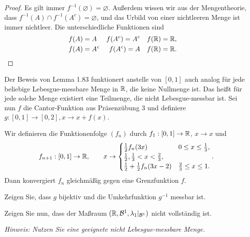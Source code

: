 \begin{proof}
	Es gilt immer $f^{-1}(\varnothing)=\varnothing$. Außerdem wissen wir aus der Mengentheorie, dass $f^{-1}(A)\cap f^{-1}(A^c)=\varnothing$, und das Urbild von einer nichtleeren Menge ist immer nichtleer. Die unterschiedliche Funktionen sind
	\begin{align*}
		& f(A)=A & f(A^c)=A^c & & f(\mathbb{R})=\mathbb{R}, \\
		& f(A)=A^c & f(A^c)=A & & f(\mathbb{R})=\mathbb{R}. & \qedhere
	\end{align*}
\end{proof}
\begin{Problem}
	Der Beweis von Lemma 1.83 funktionert anstelle von $[0,1]$ auch analog f\"{u}r jede beliebige Lebesgue-messbare Menge in $\mathbb{R}$, die keine Nullmenge ist. Das heißt f\"{u}r jede solche Menge existiert eine Teilmenge, die nicht Lebesgue-messbar ist.
	Sei nun $f$ die Cantor-Funktion aus Präsenzübung 3 und definiere $g:[0,1]\to [0,2],x\to x+f(x)$.
	\begin{tcolorbox}
		Wir definieren die Funktionenfolge $(f_n)$ durch $f_1:[0,1]\to \mathbb{R}$, $x\to x$ und
		\[
			f_{n+1}:[0,1]\to \mathbb{R},\qquad x\to \begin{cases}
				\frac{1}{2}f_n(3x) & 0 \le x \le \frac{1}{3},\\
				\frac{1}{2}, \frac{1}{3}<x<\frac{2}{3},\\
				\frac{1}{2}+\frac{1}{2}f_n(3x-2) & \frac{2}{3}\le x \le 1.
			\end{cases}
		.\] 
		Dann konvergiert $f_n$ gleichmäßig gegen eine Grenzfunktion $f$.
	\end{tcolorbox}
	\begin{parts}
		\item Zeigen Sie, dass $g$ bijektiv und die Umkehrfunktion $g^{-1}$ messbar ist.
		\item Zeigen Sie nun, dass der Maßraum $(\mathbb{R}, \mathcal{B}^1, \lambda_1|_{\mathcal{B}^1})$ nicht vollständig ist.
			
			{\footnotesize \emph{Hinweis: Nutzen Sie eine geeignete nicht Lebesgue-messbare Menge.}}
	\end{parts}
\end{Problem}
